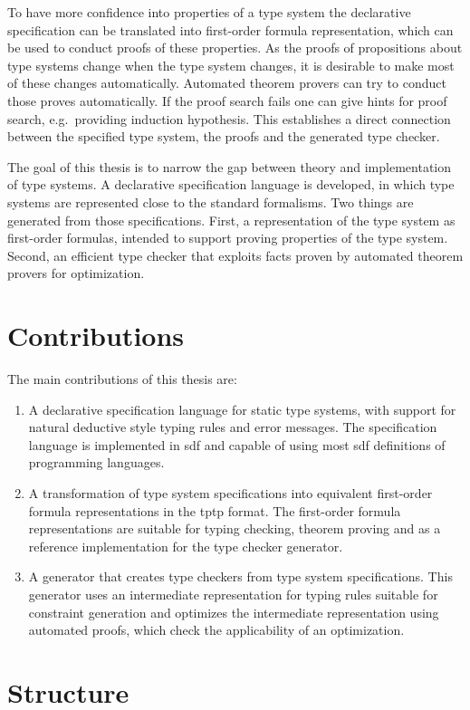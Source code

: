 To have more confidence into properties of a type system the
declarative specification can be translated into first-order formula
representation, which can be used to conduct proofs of these
properties. As the proofs of propositions about type systems change
when the type system changes, it is desirable to make most of these
changes automatically. Automated theorem provers can try to conduct
those proves automatically. If the proof search fails one can give
hints for proof search, e.g.\ providing induction hypothesis. This
establishes a direct connection between the specified type system, the
proofs and the generated type checker.

The goal of this thesis is to narrow the gap between theory and
implementation of type systems. A declarative specification language
is developed, in which type systems are represented close to the
standard formalisms. Two things are generated from those
specifications. First, a representation of the type system as
first-order formulas, intended to support proving properties of the
type system. Second, an efficient type checker that exploits facts
proven by automated theorem provers for optimization.

\section{Contributions}
The main contributions of this thesis are:
\begin{enumerate}
\item A declarative specification language for static type systems,
  with support for natural deductive style typing rules and error
  messages. The specification language is implemented in \gls{sdf} and
  capable of using most \gls{sdf} definitions of programming
  languages.
\item A transformation of type system specifications into equivalent
  first-order formula representations in the \gls{tptp} format. The
  first-order formula representations are suitable for typing
  checking, theorem proving and as a reference implementation for the
  type checker generator.
\item A generator that creates type checkers from type system
  specifications. This generator uses an intermediate representation
  for typing rules suitable for constraint generation and optimizes
  the intermediate representation using automated proofs, which check
  the applicability of an optimization.
\end{enumerate}

\section{Structure}

